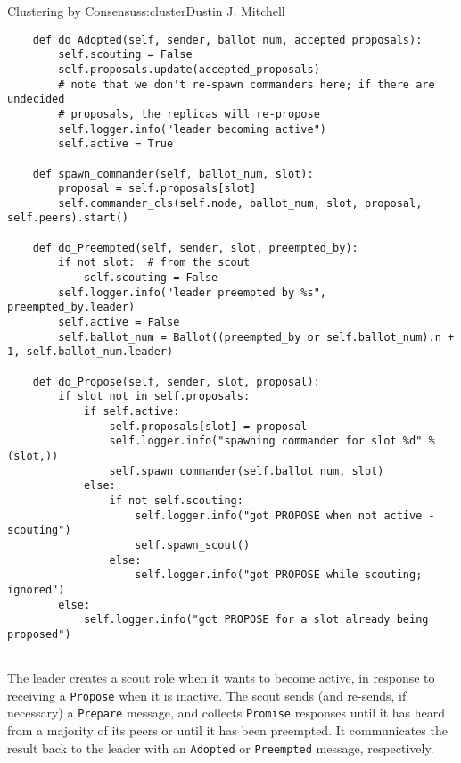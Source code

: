 \begin{aosachapter}{Clustering by Consensus}{s:cluster}{Dustin J. Mitchell}
\begin{verbatim}
    def do_Adopted(self, sender, ballot_num, accepted_proposals):
        self.scouting = False
        self.proposals.update(accepted_proposals)
        # note that we don't re-spawn commanders here; if there are undecided
        # proposals, the replicas will re-propose
        self.logger.info("leader becoming active")
        self.active = True

    def spawn_commander(self, ballot_num, slot):
        proposal = self.proposals[slot]
        self.commander_cls(self.node, ballot_num, slot, proposal, self.peers).start()

    def do_Preempted(self, sender, slot, preempted_by):
        if not slot:  # from the scout
            self.scouting = False
        self.logger.info("leader preempted by %s", preempted_by.leader)
        self.active = False
        self.ballot_num = Ballot((preempted_by or self.ballot_num).n + 1, self.ballot_num.leader)

    def do_Propose(self, sender, slot, proposal):
        if slot not in self.proposals:
            if self.active:
                self.proposals[slot] = proposal
                self.logger.info("spawning commander for slot %d" % (slot,))
                self.spawn_commander(self.ballot_num, slot)
            else:
                if not self.scouting:
                    self.logger.info("got PROPOSE when not active - scouting")
                    self.spawn_scout()
                else:
                    self.logger.info("got PROPOSE while scouting; ignored")
        else:
            self.logger.info("got PROPOSE for a slot already being proposed")
    
\end{verbatim}

The leader creates a scout role when it wants to become active, in
response to receiving a \texttt{Propose} when it is inactive. The scout
sends (and re-sends, if necessary) a \texttt{Prepare} message, and
collects \texttt{Promise} responses until it has heard from a majority
of its peers or until it has been preempted. It communicates the result
back to the leader with an \texttt{Adopted} or \texttt{Preempted}
message, respectively.

\begin{verbatim}


\end{verbatim}
\end{aosachapter}
